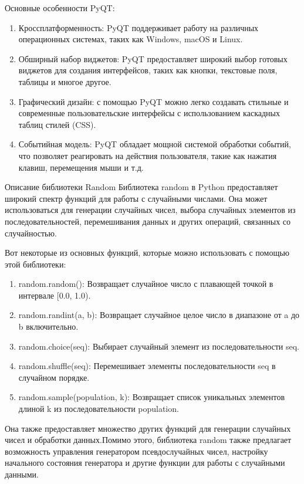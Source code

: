 Основные особенности PyQT:
\begin{enumerate}
\item Кроссплатформенность: PyQT поддерживает работу на различных операционных системах, таких как Windows, macOS и Linux.
\item Обширный набор виджетов: PyQT предоставляет широкий выбор готовых виджетов для создания интерфейсов, таких как кнопки, текстовые поля, таблицы и многое другое.
\item Графический дизайн: с помощью PyQT можно легко создавать стильные и современные пользовательские интерфейсы с использованием каскадных таблиц стилей (CSS).
\item  Событийная модель: PyQT обладает мощной системой обработки событий, что позволяет реагировать на действия пользователя, такие как нажатия клавиш, перемещения мыши и т.д.
\end{enumerate}
Описание библиотеки Random
Библиотека random в Python предоставляет широкий спектр функций для работы с случайными числами. Она может использоваться для генерации случайных чисел, выбора случайных элементов из последовательностей, перемешивания данных и других операций, связанных со случайностью.

Вот некоторые из основных функций, которые можно использовать с помощью этой библиотеки:
\begin{enumerate}
\item  random.random(): Возвращает случайное число с плавающей точкой в интервале [0.0, 1.0).

\item  random.randint(a, b): Возвращает случайное целое число в диапазоне от a до b включительно.

\item  random.choice(seq): Выбирает случайный элемент из последовательности seq.

\item random.shuffle(seq): Перемешивает элементы последовательности seq в случайном порядке.

\item random.sample(population, k): Возвращает список уникальных элементов длиной k из последовательности population.
\end{enumerate}
Она  также предоставляет множество других функций для генерации случайных чисел и обработки данных.Помимо этого, библиотека random также предлагает возможность управления генератором псевдослучайных чисел, настройку начального состояния генератора и другие функции для работы с случайными данными.
